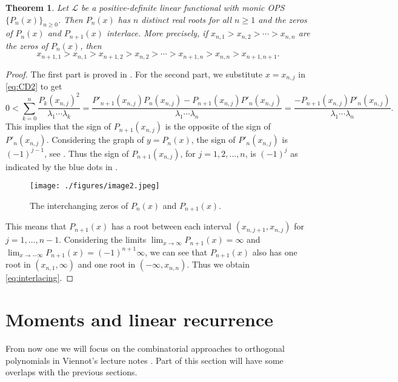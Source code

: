 \documentclass{amsart}
\numberwithin{equation}{section}
\newtheorem{thm}{Theorem}[section]
\theoremstyle{definition}
\newcommand\LL{\mathcal{L}}
\begin{document}
\begin{thm}\label{thm:zero-interlace}
  Let \( \LL \) be a positive-definite linear functional with monic
  OPS \( \{ P_n(x) \}_{n\ge 0} \). Then \( P_n(x) \) has \( n \)
  distinct real roots for all \( n\ge1 \) and the zeros of
  \( P_n(x) \) and \( P_{n+1}(x) \) interlace. More precisely, if
  \( x_{n,1}>x_{n,2} > \cdots > x_{n,n} \) are the zeros of
  \( P_n(x) \), then
  \begin{equation}\label{eq:interlacing}
    x_{n+1,1} > x_{n,1} > x_{n+1,2} >x_{n,2} > \cdots >
    x_{n+1,n}> x_{n,n} >x_{n+1,n+1}.
  \end{equation}
\end{thm}
\begin{proof}
  The first part is proved in . For the second
  part, we substitute \( x=x_{n,j} \) in \eqref{eq:CD2} to get
\[
0< \sum_{k=0}^{n} \frac{P_k(x_{n,j})^2}{\lambda_1\cdots\lambda_k} =
  \frac{P'_{n+1}(x_{n,j})P_{n}(x_{n,j}) -
    P_{n+1}(x_{n,j})P'_{n}(x_{n,j})}{\lambda_1\cdots\lambda_{n}} =
  \frac{ -
    P_{n+1}(x_{n,j})P'_{n}(x_{n,j})}{\lambda_1\cdots\lambda_{n}}.
\]
This implies that the sign of \( P_{n+1}(x_{n,j}) \) is the opposite
of the sign of \( P'_{n}(x_{n,j}) \). Considering the graph of
\( y=P_n(x) \), the sign of \( P'_n(x_{n,j}) \) is \( (-1)^{j-1} \),
see . Thus the sign of \( P_{n+1}(x_{n,j}) \), for
\( j=1,2,\ldots,n \), is \( (-1)^j \) as indicated by the blue dots in
.
\begin{figure}
  \centering
  \texttt{[image: ./figures/image2.jpeg]}
  \caption{The interchanging zeros of \( P_n(x) \) and \( P_{n+1}(x) \).}
  \label{fig:image2}
\end{figure}
This means that \( P_{n+1}(x) \) has a root between each interval
\( (x_{n,j+1},x_{n,j}) \) for \( j=1,\dots,n-1 \). Considering the
limits \( \lim_{x\to \infty} P_{n+1}(x) = \infty\) and
\( \lim_{x\to -\infty} P_{n+1}(x) = (-1)^{n+1} \infty\), we can see
that \( P_{n+1}(x) \) also has one root in \( (x_{n,1},\infty) \) and
one root in \( (-\infty,x_{n,n}) \). Thus we obtain
\eqref{eq:interlacing}.
\end{proof}



\section{Moments and linear recurrence}

From now one we will focus on the combinatorial approaches to
orthogonal polynomials in Viennot's lecture notes \cite{ViennotLN}.
Part of this section will have some overlaps with the previous
sections.
\end{document}
